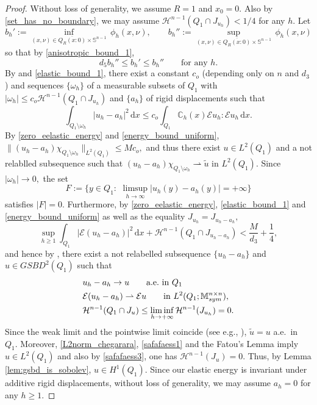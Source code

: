 \documentclass[reqno]{amsart}
\numberwithin{equation}{section}
\theoremstyle{plain}
\theoremstyle{definition}
\newcommand{\C}{\mathbb{C}}
\renewcommand{\S}{\mathbb{S}}
\newcommand{\cH}{\mathcal{H}}
\newcommand{\wk}{\rightharpoonup}
\newcommand{\cl}[1]{\overline{#1}}
\renewcommand{\d}{\mathrm{d}}
\renewcommand{\tilde}{\widetilde}
\newcommand{\str}[1]{\mathcal{E}#1}
\newcommand{\mtwo}{\mathbb{M}^{n\times n}_{\rm sym}}
\begin{document}
\begin{proof}
Without loss of generality, we assume $R=1$ and $x_0=0.$ 
Also by \eqref{set_has_no_boundary}, we may assume $\cH^{n-1} (Q_1\cap J_{u_h})<1/4$ for any $h.$
Let
$$
b_h':=\inf\limits_{(x,\nu)\in \cl{Q_R(x:0)}\times \S^{n-1}}\,\phi_h(x,\nu),\qquad b_h'':= \sup\limits_{(x,\nu)\in \cl{Q_R(x:0)}\times \S^{n-1}}\,\phi_h(x,\nu) 
$$
so that by \eqref{anisotropic_bound_1},
%
\begin{equation}\label{new_anis_b}
d_5 b_h'' \le b_h'\le b_h''\qquad \text{for any $h.$}
\end{equation}
%
By \cite[Proposition 2]{CCF:2016} and \eqref{elastic_bound_1}, there exist a constant $c_o$ (depending only on $n$ and $d_3$) and sequences $\{\omega_h\}$ of a measurable subsets of $Q_1$ with $|\omega_h|\le c_o\cH^{n-1} (Q_1\cap J_{u_h})$ and $\{a_h\}$ of  rigid displacements such that 
%
\begin{equation}\label{L2norm_chegarara}
\int_{Q_1\setminus \omega_h} |u_h - a_h|^2\,\d x \le c_o\int_{Q_1}\C_h(x)\str{u_h}:\str{u_h}\,\d x.  
\end{equation}
%
By \eqref{zero_eelastic_energy} and \eqref{energy_bound_uniform}, $\|(u_h - a_h) \chi_{Q_1\setminus \omega_h}\|_{L^2(Q_1)} \le Mc_o,$ and thus there exist  $u\in L^2(Q_1)$ and a not relablled subsequence such that
$
(u_h - a_h) \chi_{Q_1\setminus \omega_h} \wk  \tilde u 
$
in $L^2(Q_1).$  Since $|\omega_h|\to0,$ the set  
$$
F:=\{y\in Q_1:\,\,\limsup\limits_{h\to\infty}|u_h(y) - a_h(y)|=+\infty\}
$$
satisfies $|F|=0.$  Furthermore, by \eqref{zero_eelastic_energy}, \eqref{elastic_bound_1} and \eqref{energy_bound_uniform} as well as the equality $J_{u_h}=J_{u_h - a_h},$ %
$$
\sup\limits_{h\ge1} \int_{Q_1} |\str{(u_h-a_h)}|^2\,\d x +\cH^{n-1} (Q_1\cap J_{u_h-a_h}) < \frac{M}{d_3} + \frac{1}{4},
$$
and hence  by \cite[Theorem 1.1]{ChC:2020_jems}, there  exist  a not relabelled subsequence $\{u_h-a_h\}$
and $u\in GSBD^2(Q_1)$  such that 
\begin{align}
& u_h-a_h \to  u\qquad \text{a.e.\  in $Q_1$} \label{safafaess1}\\
& \str{(u_h-a_h)} \wk \str{u}\qquad \text{in $L^2(Q_1;\mtwo),$} \label{safafaess2}\\
& \cH^{n-1} (Q_1 \cap J_u) \le
\liminf\limits_{h\to+\infty} \cH^{n-1} (J_{u_h}) =0.\label{safafaess3} 
\end{align}
Since the weak limit and the pointwise limit coincide (see e.g., \cite[page 266]{DiBen:2002_book}), $\tilde u = u$ a.e.\  in $Q_1.$ Moreover,   \eqref{L2norm_chegarara}, \eqref{safafaess1} and the Fatou's Lemma imply $u\in L^2(Q_1)$ and also by \eqref{safafaess3}, one has $\cH^{n-1} (J_u)=0.$ Thus, by Lemma \ref{lem:gsbd_is_sobolev}, $u\in H^1(Q_1 )$.
Since our elastic energy is invariant under additive rigid displacements, without loss of generality, we may assume $a_h=0$ for any $h\ge1.$


\end{proof}
\end{document}
